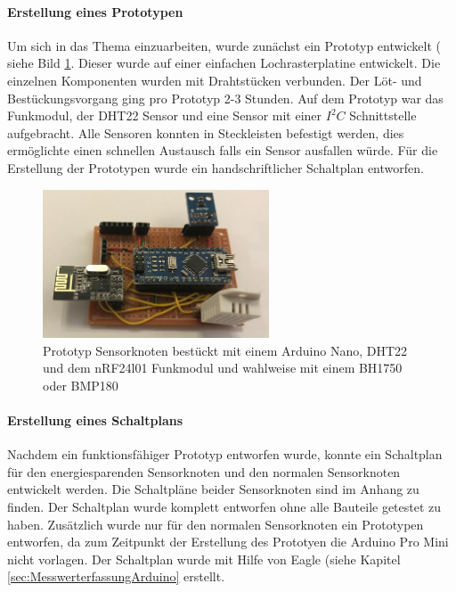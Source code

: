 \paragraph{Erstellung eines Prototypen} Um sich in das Thema einzuarbeiten, wurde zunächst ein Prototyp entwickelt ( siehe Bild \ref{img:prototyp}. Dieser wurde auf einer einfachen Lochrasterplatine entwickelt. Die einzelnen Komponenten wurden mit Drahtstücken verbunden. Der Löt- und Bestückungsvorgang ging pro Prototyp 2-3 Stunden. Auf dem Prototyp war das Funkmodul, der DHT22 Sensor und eine Sensor mit einer $I^2C$ Schnittstelle aufgebracht. Alle Sensoren konnten in Steckleisten befestigt werden, dies ermöglichte einen schnellen Austausch falls ein Sensor ausfallen würde. Für die Erstellung der Prototypen wurde ein handschriftlicher Schaltplan entworfen.
\begin{figure}
	\centering
	\includegraphics[width=0.6\textwidth]{bilder/prototyp.jpg}
	\caption[Prototyp Sensorknoten]{ Prototyp Sensorknoten bestückt mit einem Arduino Nano, DHT22 und dem nRF24l01 Funkmodul und wahlweise mit einem BH1750 oder BMP180}
	\label{img:prototyp}
\end{figure}

\paragraph{Erstellung eines Schaltplans} Nachdem ein funktionsfähiger Prototyp entworfen wurde, konnte ein Schaltplan für den energiesparenden Sensorknoten und den normalen Sensorknoten entwickelt werden. Die Schaltpläne beider Sensorknoten sind im Anhang zu finden. Der Schaltplan wurde komplett entworfen ohne alle Bauteile getestet zu haben. Zusätzlich wurde nur für den normalen Sensorknoten ein Prototypen entworfen, da zum Zeitpunkt der Erstellung des Prototyen die Arduino Pro Mini nicht vorlagen. Der Schaltplan wurde mit Hilfe von Eagle (siehe Kapitel \ref{sec:MesswerterfassungArduino} erstellt.
